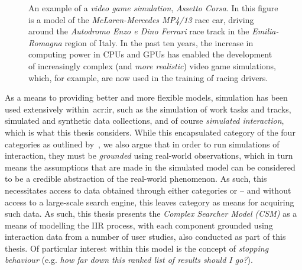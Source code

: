 \begin{figure}[t!]
    \centering
    \caption[Racing Simulator Example]{An example of a \emph{video game simulation}, \emph{Assetto Corsa}. In this figure is a model of the \emph{McLaren-Mercedes MP4/13} race car, driving around the \emph{Autodromo Enzo e Dino Ferrari} race track in the \emph{Emilia-Romagna} region of Italy. In the past ten years, the increase in computing power in CPUs and GPUs has enabled the development of increasingly complex (and \emph{more realistic}) video game simulations, which, for example, are now used in the training of racing drivers.}
    \label{fig:ch1-mclaren}
\end{figure}

As a means to providing better and more flexible models, simulation has been used extensively within~\gls{acr:ir}, such as the simulation of work tasks and tracks, simulated and synthetic data collections, and of course \emph{simulated interaction}, which is what this thesis considers. While this encapsulated category  of the four categories as outlined by~\citealp{keskustalo2008user_simulation}, we also argue that in order to run simulations of interaction, they must be \emph{grounded} using real-world observations, which in turn means the assumptions that are made in the simulated model can be considered to be a credible abstraction of the real-world phenomenon. As such, this necessitates access to data obtained through either categories  or  -- and without access to a large-scale search engine, this leaves category  as means for acquiring such data. As such, this thesis presents the \emph{Complex Searcher Model (CSM)} as a means of modelling the IIR process, with each component grounded using interaction data from a number of user studies, also conducted as part of this thesis. Of particular interest within this model is the concept of \emph{stopping behaviour} (e.g. \emph{how far down this ranked list of results should I go?}).

